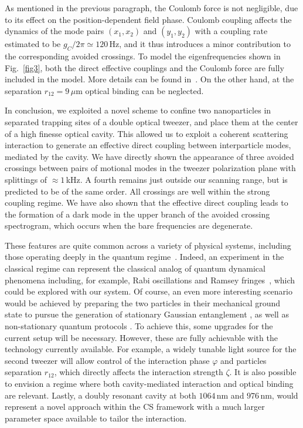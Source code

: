 \documentclass[aps,preprint,singlecolumn,nopacs,superscriptaddress,groupedaddress]{revtex4}
\begin{document}
As mentioned in the previous paragraph, the Coulomb force is not negligible, due to its effect on the position-dependent field phase. Coulomb coupling affects the dynamics of the mode pairs $(x_1,x_2)$ and $(y_1,y_2)$ with a coupling rate estimated to be $g_C/2\pi\simeq120$\,Hz, and it thus introduces a minor contribution to the corresponding avoided crossings. To model the eigenfrequencies shown in Fig.~\ref{fig3}, both the direct effective couplings and the Coulomb force are fully included in the model. More details can be found in~\cite{supp}.  On the other hand, at the separation $r_{12}=9\,\mu$m optical binding can be neglected.


In conclusion, we exploited a novel scheme to confine two nanoparticles in separated trapping sites of a double optical tweezer, and place them at the center of a high finesse optical cavity. This allowed us to exploit a coherent scattering interaction to generate an effective direct coupling between interparticle modes, mediated by the cavity. We have directly shown the appearance of three avoided crossings between pairs of motional modes in the tweezer polarization plane with splittings of $\approx1$\,kHz. A fourth remains just outside our scanning range, but is predicted to be of the same order. All crossings are well within the strong coupling regime. We have also shown that the effective direct coupling leads to the formation of a dark mode in the upper branch of the avoided crossing spectrogram, which occurs when the bare frequencies are degenerate.

These features are quite common across a variety of physical systems, including those operating deeply in the quantum regime~\cite{Trebbia2022Tailoring,Majer2007Couplingsuperconducting}. Indeed, an experiment in the classical regime can represent the classical analog of quantum dynamical phenomena including, for example, Rabi oscillations and Ramsey fringes~\cite{Ivakhnenko2018Simulating,Frimmer2014TheclassicalBloch}, which could be explored with our system. Of course, an even more interesting scenario would be achieved by preparing the two particles in their mechanical ground state to pursue the generation of stationary Gaussian entanglement \cite{Chauhan2020Stationary}, as well as non-stationary quantum protocols \cite{Rudolph2020,Brando2021Coherent}. To achieve this, some upgrades for the current setup will be necessary. However, these are fully achievable with the technology currently available. For example, a widely tunable light source for the second tweezer will allow control of the interaction phase $\varphi$ and particles separation $r_{12}$, which directly affects the interaction strength $\zeta$. It is also possible to envision a regime where both cavity-mediated interaction and optical binding are relevant. Lastly, a doubly resonant cavity at both $1064$\,nm and $976$\,nm, would represent a novel approach within the CS framework with a much larger parameter space available to tailor the interaction.
\end{document}
